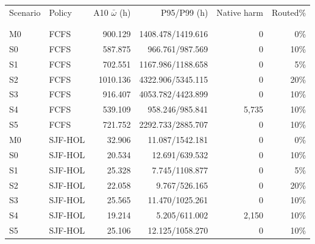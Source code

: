 \begin{tabular}{llrrrr}
\toprule
Scenario & Policy & A10 $\bar\omega$ (h) & P95/P99 (h) & Native harm & Routed\%\\
\\
\midrule\\
M0 & FCFS & 900.129 & 1408.478/1419.616 & 0 & 0\%\\
S0 & FCFS & 587.875 & 966.761/987.569 & 0 & 10\%\\
S1 & FCFS & 702.551 & 1167.986/1188.658 & 0 & 5\%\\
S2 & FCFS & 1010.136 & 4322.906/5345.115 & 0 & 20\%\\
S3 & FCFS & 916.407 & 4053.782/4423.899 & 0 & 10\%\\
S4 & FCFS & 539.109 & 958.246/985.841 & 5,735 & 10\%\\
S5 & FCFS & 721.752 & 2292.733/2885.707 & 0 & 10\%\\
M0 & SJF-HOL & 32.906 & 11.087/1542.181 & 0 & 0\%\\
S0 & SJF-HOL & 20.534 & 12.691/639.532 & 0 & 10\%\\
S1 & SJF-HOL & 25.328 & 7.745/1108.877 & 0 & 5\%\\
S2 & SJF-HOL & 22.058 & 9.767/526.165 & 0 & 20\%\\
S3 & SJF-HOL & 25.565 & 11.470/1025.261 & 0 & 10\%\\
S4 & SJF-HOL & 19.214 & 5.205/611.002 & 2,150 & 10\%\\
S5 & SJF-HOL & 25.106 & 12.125/1058.270 & 0 & 10\%\\
\bottomrule
\end{tabular}
